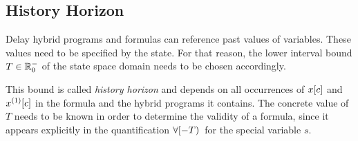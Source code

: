     \subsection{History Horizon}
        \label{sec:history-horizon}

        Delay hybrid programs and \ddL formulas can reference past values of variables. These values need to be specified by the state.
        For that reason, the lower interval bound $T\in\mathbb{R}^-_0$ of the state space domain needs to be chosen accordingly.

        This bound is called \emph{history horizon} and depends on all occurrences of $x[c]$ and $\Dx[c]$ in the formula and the hybrid programs it contains.
        The concrete value of $T$ needs to be known in order to determine the validity of a formula, since it appears explicitly in the quantification $\forall [-T){\,}$ for the special variable $s$.

